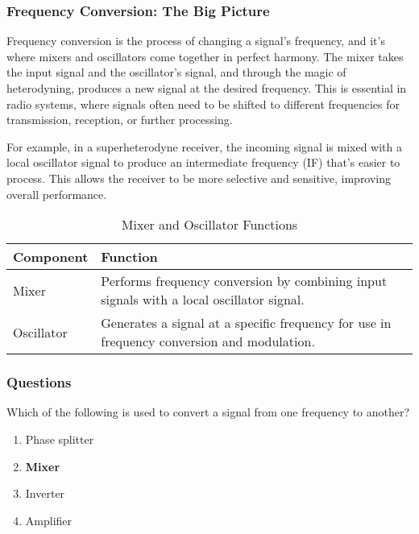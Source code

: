\subsubsection*{Frequency Conversion: The Big Picture}

Frequency conversion is the process of changing a signal's frequency, and it's where mixers and oscillators come together in perfect harmony. The mixer takes the input signal and the oscillator's signal, and through the magic of heterodyning, produces a new signal at the desired frequency. This is essential in radio systems, where signals often need to be shifted to different frequencies for transmission, reception, or further processing.

For example, in a superheterodyne receiver, the incoming signal is mixed with a local oscillator signal to produce an intermediate frequency (IF) that's easier to process. This allows the receiver to be more selective and sensitive, improving overall performance.


\begin{table}[h!]
    \centering
    \begin{tabular}{|l|l|}
        \hline
        \textbf{Component} & \textbf{Function} \\
        \hline
        Mixer & Performs frequency conversion by combining input signals with a local oscillator signal. \\
        Oscillator & Generates a signal at a specific frequency for use in frequency conversion and modulation. \\
        \hline
    \end{tabular}
    \caption{Mixer and Oscillator Functions}
    \label{tab:mixer-oscillator}
\end{table}

\subsubsection{Questions}

\begin{tcolorbox}[colback=gray!10!white,colframe=black!75!black,title={T7A03}]
    Which of the following is used to convert a signal from one frequency to another?
    \begin{enumerate}[label=\Alph*),noitemsep]
        \item Phase splitter
        \item \textbf{Mixer}
        \item Inverter
        \item Amplifier
    \end{enumerate}
\end{tcolorbox}

